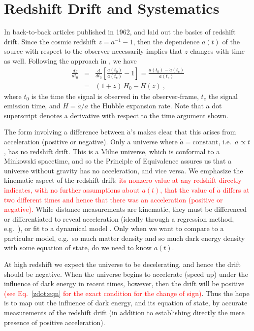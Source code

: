 \documentclass[preprint2, 10pt]{aastex}
\newcommand{\bea}{\begin{eqnarray}}
\newcommand{\eea}{\end{eqnarray}}
\begin{document}
\section{Redshift Drift and Systematics} \label{sec:basic} 

In back-to-back articles published in 1962, \citet{mcvittie} and 
\citet{sandage} laid out the basics of redshift drift.  Since the 
cosmic redshift $z=a^{-1}-1$, then the dependence $a(t)$ of the source with 
respect to the observer necessarily implies that $z$ changes with time as 
well. Following the approach in \citet{fpoc}, we have 
\bea 
\frac{dz}{dt_0}&=&\frac{d}{dt_0}\left[\frac{a(t_0)}{a(t_e)}-1\right] 
=\frac{\dot a(t_0)-\dot a (t_e)}{a(t_e)}\\ 
&=&(1+z)\,H_0-H(z)\ , \label{zdot:eqn}
\eea 
where $t_0$ is the time the signal is observed in the observer-frame, 
$t_e$ the signal emission time, and $H=\dot a/a$ the Hubble expansion rate. 
Note that a dot superscript denotes a derivative with respect to the 
time argument shown. 

The form involving a difference 
between $\dot a$'s makes clear that this arises from acceleration (positive 
or negative).
Only a universe where $\dot a=\mbox{constant}$, i.e.\ $a\propto t$, 
has no redshift drift.  This is a Milne universe, which is conformal to a 
Minkowski spacetime, and so the Principle of Equivalence assures us that 
a universe without gravity has no acceleration, and vice versa. 
We emphasize the kinematic aspect of the redshift drift:
\textcolor{red}{
its nonzero 
value at any redshift directly indicates,
with no further assumptions about $a(t)$,
that the value of $\dot{a}$ differs at two different times and hence that there was an acceleration
(positive or negative).
} 
While distance measurements are kinematic, they must be differenced or 
differentiated to reveal acceleration (ideally through a regression 
method, e.g.\ \citet{2012PhRvD..85l3530S,2012JCAP...06..036S}), or fit to 
a dynamical model \citep{1998AJ....116.1009R,1999ApJ...517..565P}. 
Only when we want to compare 
to a particular model, e.g.\ so much matter density and so much dark energy 
density with some equation of state, do we need to know $a(t)$.


At high redshift we expect the universe to be decelerating, and hence 
the drift should be negative.  When the universe begins to accelerate 
(speed up) under the influence of dark energy in recent times, however, 
then the drift will be positive
\textcolor{red}{
(see Eq.~\ref{zdot:eqn} for the exact condition for the change of sign)}.  Thus the hope is to map out the 
influence of dark energy, and its equation of state, by accurate 
measurements of the redshift drift (in addition to establishing directly 
the mere presence of positive acceleration). 
\end{document}
